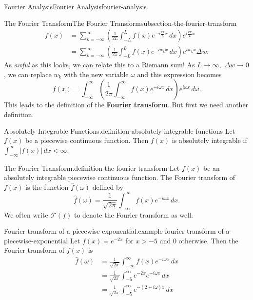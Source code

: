 \documentclass[oneside,10pt,]{book}
\newcommand{\terminology}[1]{\textbf{#1}}
\numberwithin{equation}{section}
\newcommand{\lt}{<}
\newcommand{\amp}{&}
\begin{document}
\begin{chapterptx}{Fourier Analysis}{}{Fourier Analysis}{}{}{fourier-analysis}
\begin{sectionptx}{The Fourier Transform}{}{The Fourier Transform}{}{}{subsection-the-fourier-transform}
\begin{align*}
f(x) \amp = \sum_{k=-\infty}^{\infty}\left(\frac{1}{2L}\int_{-L}^{L}f(x)e^{-i\frac{k\pi}{L}x}\,dx\right)e^{i\frac{k\pi}{L}x} \\
\amp = \sum_{k=-\infty}^{\infty}\left(\frac{1}{2\pi}\int_{-L}^{L}f(x)e^{-iw_{k}x}\,dx\right)e^{iw_{k}x}\Delta w. 
\end{align*}
As \emph{awful} as this looks, we can relate this to a Riemann sum! As \(L\to\infty,\) \(\Delta w\to0\), we can replace \(w_{k}\) with the new variable \(\omega\) and this expression becomes%
\begin{equation*}
f(x) = \int_{-\infty}^{\infty}\left(\frac{1}{2\pi}\int_{-\infty}^{\infty}f(x)e^{-i\omega x}\,dx\right)e^{i\omega x}\,d\omega.
\end{equation*}
This leads to the definition of the \terminology{Fourier transform}. But first we need another definition.%
\begin{definition}{Absolutely Integrable Functions.}{definition-absolutely-integrable-functions}%
\hypertarget{p-616}{}%
Let \(f(x)\) be a piecewise continuous function. Then \(f(x)\) is absolutely integrable if \(\int_{-\infty}^{\infty}|f(x)|\,dx \lt \infty.\)%
\end{definition}
\begin{definition}{The Fourier Transform.}{definition-the-fourier-transform}%
\hypertarget{p-617}{}%
Let \(f(x)\) be an absolutely integrable piecewise continuous function. The Fourier transform of \(f(x)\) is the function \(\hat{f}(\omega)\) defined by%
\begin{equation*}
\hat{f}(\omega) = \frac{1}{\sqrt{2\pi}}\int_{-\infty}^{\infty}f(x)e^{-i\omega x}\,dx.
\end{equation*}
We often write \(\mathcal{F}(f)\) to denote the Fourier transform as well.%
\end{definition}
\begin{example}{Fourier transform of a piecewise exponential.}{example-fourier-transform-of-a-piecewise-exponential}%
\hypertarget{p-618}{}%
Let \(f(x) = e^{-2x}\) for \(x>-5\) and \(0\) otherwise. Then the Fourier transform of \(f(x)\) is%
\begin{align*}
\hat{f}(\omega) \amp = \frac{1}{\sqrt{2\pi}}\int_{-\infty}^{\infty}f(x)e^{-i\omega x}\,dx \\
\amp = \frac{1}{\sqrt{2\pi}}\int_{-5}^{\infty}e^{-2x}e^{-i\omega x}\,dx \\
\amp = \frac{1}{\sqrt{2\pi}}\int_{-5}^{\infty}e^{-(2+i\omega)x}\,dx \\

\end{align*}
\end{example}
\end{sectionptx}
\end{chapterptx}
\end{document}
